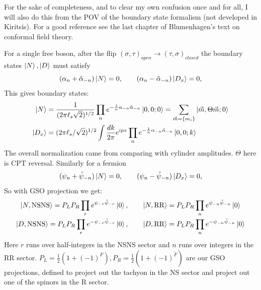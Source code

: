 \documentclass[11pt, class=article, crop=false]{standalone}
\begin{document}
\begin{enumerate}
	For the sake of completeness, and to clear my own confusion once and for all, I will also do this from the POV of the boundary state formalism (not developed in Kiritsis). For a good reference see the last chapter of Blumenhagen's text on conformal field theory. 
	
	For a single free boson, after the flip $(\sigma, \tau)_{open} \to (\tau, \sigma)_{closed}$ the boundary states $\ket{N}, \ket{D}$ must satisfy 
	\[
		( \alpha_n + \tilde \alpha_{-n}) \ket N = 0, \qquad ( \alpha_n - \tilde \alpha_{-n}) \ket{D_x} = 0,
	\]
	This gives boundary states:
	\[
		\begin{aligned}
			\ket{N} &= \frac{1}{(2\pi \ell_s \sqrt{2})^{1/2}} \prod_n e^{- \frac1n \alpha_{-n} \tilde \alpha_{-n}} \ket{0,0; 0} = \sum_{\vec m = \{m_i\}} \ket{\vec m, \Theta \vec m; 0} \\
			\ket{D_x} &= (2\pi \ell_s/\sqrt{2})^{1/2} \int \frac{dk}{2\pi} e^{i p x} \prod_n e^{- \frac1n \alpha_{-n} \tilde \alpha_{-n}} \ket{0,0; k}\\			
		\end{aligned}
	\]
	The overall normalization came from comparing with cylinder amplitudes. $\Theta$ here is CPT reversal. Similarly for a fermion
	\[
		( \psi_n + \tilde \psi_{-n}) \ket N = 0, \qquad ( \psi_n - \tilde \psi_{-n}) \ket{D_x} = 0,
	\]
	So with GSO projection we get:
	\[
	\begin{aligned}
		\ket{N, \text{NSNS}} = P_L P_R \prod_r e^{\psi_{-r} \tilde \psi_{-r} } \ket{0}, &\qquad \ket{N, \text{RR}} = P_L P_R \prod_n e^{\psi_{-n} \tilde \psi_{-n} } \ket{0}\\
		\ket{D, \text{NSNS}} = P_L P_R \prod_r e^{-\psi_{-r} \tilde \psi_{-r} } \ket{0}, &\qquad \ket{D, \text{RR}} = P_L P_R \prod_n e^{-\psi_{-n} \tilde \psi_{-n} } \ket{0}
	\end{aligned}
	\]
	Here $r$ runs over half-integers in the NSNS sector and $n$ runs over integers in the RR sector. $P_L = \frac12( 1 + (-1)^F), P_R = \frac12 (1 + (-1)^{\tilde F})$ are our GSO projections, defined to project out the tachyon in the NS sector and project out one of the spinors in the R sector. 
	

\end{enumerate}
\end{document}
